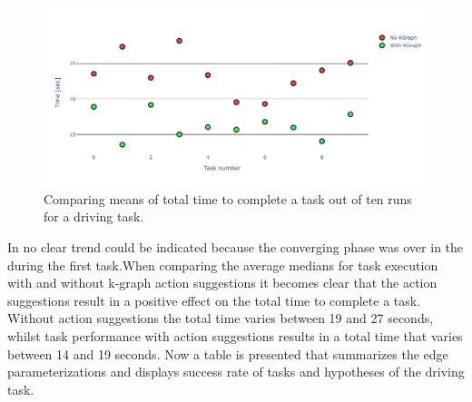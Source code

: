 \begin{figure}[H]
    \centering
    \includegraphics[width=\textwidth]{figures/results/random_drive_time_vs}
    \caption{Comparing means of total time to complete a task out of ten runs for a driving task.}\label{fig:random_drive_time_vs}
\end{figure}

In  no clear trend could be indicated because the converging phase was over in the during the first task.When comparing the average medians for task execution with and without \ac{k-graph} action suggestions it becomes clear that the action suggestions result in a positive effect on the total time to complete a task. Without action suggestions the total time varies between 19 and 27 seconds, whilst task performance with action suggestions results in a total time that varies between 14 and 19 seconds. Now a table is presented that summarizes the edge parameterizations and displays success rate of tasks and hypotheses of the driving task.\bs

